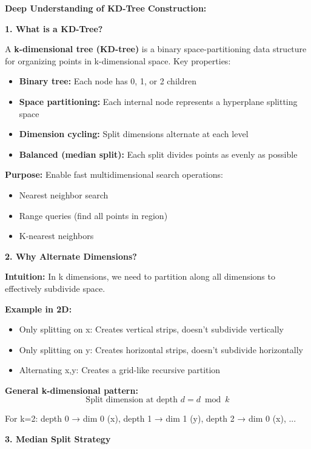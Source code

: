 \documentclass[12pt]{article}
\begin{document}
\begin{explanation}
\textbf{Deep Understanding of KD-Tree Construction:}

\textbf{1. What is a KD-Tree?}

A \textbf{k-dimensional tree (KD-tree)} is a binary space-partitioning data structure for organizing points in k-dimensional space. Key properties:

\begin{itemize}
    \item \textbf{Binary tree:} Each node has 0, 1, or 2 children
    \item \textbf{Space partitioning:} Each internal node represents a hyperplane splitting space
    \item \textbf{Dimension cycling:} Split dimensions alternate at each level
    \item \textbf{Balanced (median split):} Each split divides points as evenly as possible
\end{itemize}

\textbf{Purpose:} Enable fast multidimensional search operations:
\begin{itemize}
    \item Nearest neighbor search
    \item Range queries (find all points in region)
    \item K-nearest neighbors
\end{itemize}

\textbf{2. Why Alternate Dimensions?}

\textbf{Intuition:} In k dimensions, we need to partition along all dimensions to effectively subdivide space.

\textbf{Example in 2D:}
\begin{itemize}
    \item Only splitting on x: Creates vertical strips, doesn't subdivide vertically
    \item Only splitting on y: Creates horizontal strips, doesn't subdivide horizontally
    \item Alternating x,y: Creates a grid-like recursive partition
\end{itemize}

\textbf{General k-dimensional pattern:}
\[
\text{Split dimension at depth } d = d \bmod k
\]

For k=2: depth 0 → dim 0 (x), depth 1 → dim 1 (y), depth 2 → dim 0 (x), ...

\textbf{3. Median Split Strategy}


\end{explanation}
\end{document}
